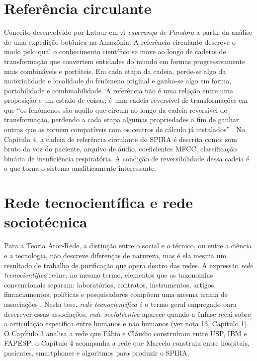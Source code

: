 \begin{description}
\bigskip

\section*{Referência circulante}

Conceito desenvolvido por Latour em \textit{A esperança de Pandora} a partir da análise de uma expedição botânica na Amazônia. A referência circulante descreve o modo pelo qual o conhecimento científico se move ao longo de cadeias de transformação que convertem entidades do mundo em formas progressivamente mais combináveis e portáteis. Em cada etapa da cadeia, perde-se algo da materialidade e localidade do fenômeno original e ganha-se algo em forma, portabilidade e combinabilidade. A referência não é uma relação entre uma proposição e um estado de coisas; é uma cadeia reversível de transformações em que ``os fenômenos são aquilo que circula ao longo da cadeia reversível de transformação, perdendo a cada etapa algumas propriedades a fim de ganhar outras que as tornem compatíveis com os centros de cálculo já instalados'' \parencite[p.~84]{Latour2017Esperanca}. No Capítulo 4, a cadeia de referência circulante do SPIRA é descrita como: som bruto da voz do paciente, arquivo de áudio, coeficientes MFCC, classificação binária de insuficiência respiratória. A condição de reversibilidade dessa cadeia é o que torna o sistema analiticamente interessante.

\bigskip

\section*{Rede tecnocientífica e rede sociotécnica}

Para a Teoria Ator-Rede, a distinção entre o social e o técnico, ou entre a ciência e a tecnologia, não descreve diferenças de natureza, mas é ela mesma um resultado de trabalho de purificação que opera dentro das redes. A expressão \textit{rede tecnocientífica} reúne, no mesmo termo, elementos que as taxonomias convencionais separam: laboratórios, contratos, instrumentos, artigos, financiamentos, políticas e pesquisadores compõem uma mesma trama de associações \parencite{Latour2011CienciaEmAcao}. Nesta tese, \textit{rede tecnocientífica} é o termo geral empregado para descrever essas associações; \textit{rede sociotécnica} aparece quando a ênfase recai sobre a articulação específica entre humanos e não humanos (ver nota 13, Capítulo 1). O Capítulo 3 analisa a rede que Fábio e Cláudio construíram entre USP, IBM e FAPESP; o Capítulo 4 acompanha a rede que Marcelo construiu entre hospitais, pacientes, smartphones e algoritmos para produzir o SPIRA.


\end{description}
